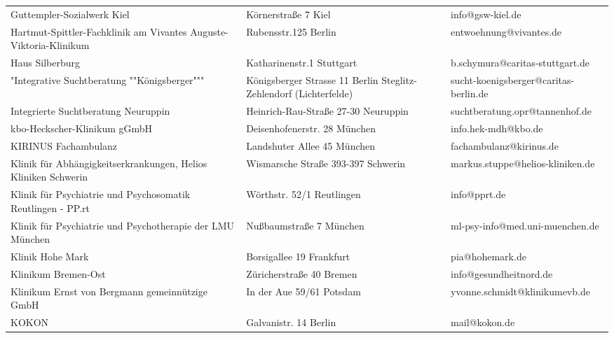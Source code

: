 {\begin{xltabular}{\textwidth} {
 >{\raggedright\arraybackslash}p{5cm}
 >{\raggedright\arraybackslash}X
 >{\raggedright\arraybackslash}p{5cm} }
Guttempler-Sozialwerk Kiel & Körnerstraße 7 Kiel & info@gsw-kiel.de \\
Hartmut-Spittler-Fachklinik am Vivantes Auguste-Viktoria-Klinikum & Rubensstr.125 Berlin & entwoehnung@vivantes.de \\
Haus Silberburg & Katharinenstr.1 Stuttgart & b.schymura@caritas-stuttgart.de \\
"Integrative Suchtberatung ""Königsberger""" & Königsberger Strasse 11 Berlin Steglitz-Zehlendorf (Lichterfelde) & sucht-koenigsberger@caritas-berlin.de \\
Integrierte Suchtberatung Neuruppin & Heinrich-Rau-Straße 27-30 Neuruppin & suchtberatung.opr@tannenhof.de \\
kbo-Heckscher-Klinikum gGmbH & Deisenhofenerstr. 28 München & info.hek-mdh@kbo.de \\
KIRINUS Fachambulanz & Landshuter Allee 45 München & fachambulanz@kirinus.de \\
Klinik für Abhängigkeitserkrankungen, Helios Kliniken Schwerin & Wismarsche Straße 393-397 Schwerin & markus.stuppe@helios-kliniken.de \\
Klinik für Psychiatrie und Psychosomatik Reutlingen - PP.rt & Wörthstr. 52/1 Reutlingen & info@pprt.de \\
Klinik für Psychiatrie und Psychotherapie der LMU München & Nußbaumstraße 7 München & ml-psy-info@med.uni-muenchen.de \\
Klinik Hohe Mark & Borsigallee 19 Frankfurt & pia@hohemark.de \\
Klinikum Bremen-Ost & Züricherstraße 40 Bremen & info@gesundheitnord.de \\
Klinikum Ernst von Bergmann gemeinnützige GmbH & In der Aue 59/61 Potsdam & yvonne.schmidt@klinikumevb.de \\
KOKON & Galvanistr. 14 Berlin & mail@kokon.de \\

\end{xltabular}}
